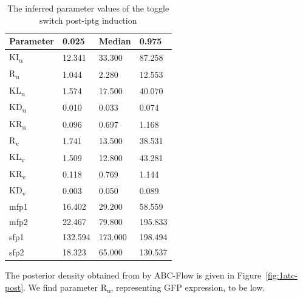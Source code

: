 \begin{table}[htbp]
\centering
\caption{The inferred parameter values of the toggle switch post-\acrshort{iptg} induction}
\label{tab:inf_params_iptg}
\begin{tabular}{@{}llll@{}}
\toprule
Parameter & 0.025 & Median & 0.975 \\ \midrule
KI\textsubscript{u} & 12.341 & 33.300 & 87.258 \\
R\textsubscript{u} & 1.044 & 2.280 & 12.553 \\
KL\textsubscript{u} & 1.574 & 17.500 & 40.070 \\
KD\textsubscript{u} & 0.010 & 0.033 & 0.074 \\
KR\textsubscript{u} & 0.096 & 0.697 & 1.168 \\
R\textsubscript{v} & 1.741 & 13.500 & 38.531 \\
KL\textsubscript{v} & 1.509 & 12.800 & 43.281 \\
KR\textsubscript{v} & 0.118 & 0.769 & 1.144 \\
KD\textsubscript{v} & 0.003 & 0.050 & 0.089 \\
mfp1 & 16.402 & 29.200 & 58.559 \\
mfp2 & 22.467 & 79.800 & 195.833 \\
sfp1 & 132.594 & 173.000 & 198.494 \\
sfp2 & 18.323 & 65.000 & 130.537 \\ \bottomrule
\end{tabular}
\end{table}


The posterior density obtained from by ABC-Flow is given in Figure~\ref{fig:1atc-post}. We find parameter R\textsubscript{u}, representing GFP expression, to be  low. 

